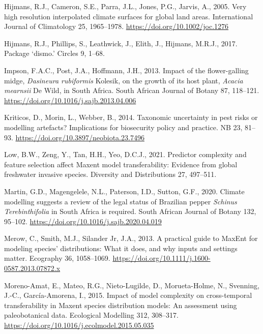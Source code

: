 \documentclass[12pt,]{article}
\begin{document}
\begin{CSLReferences}{1}{0}
\leavevmode\hypertarget{ref-Hijmans2005}{}%
Hijmans, R.J., Cameron, S.E., Parra, J.L., Jones, P.G., Jarvis, A.,
2005. Very high resolution interpolated climate surfaces for global land
areas. International Journal of Climatology 25, 1965--1978.
\url{https://doi.org/10.1002/joc.1276}

\leavevmode\hypertarget{ref-hijmans2017package}{}%
Hijmans, R.J., Phillips, S., Leathwick, J., Elith, J., Hijmans, M.R.J.,
2017. Package {`dismo.'} Circles 9, 1--68.

\leavevmode\hypertarget{ref-Impson2013}{}%
Impson, F.A.C., Post, J.A., Hoffmann, J.H., 2013. Impact of the
flower-galling midge, {\emph{Dasineura rubiformis}} {Kolesik}, on the
growth of its host plant, {\emph{Acacia mearnsii}} {De Wild}, in {South
Africa}. South African Journal of Botany 87, 118--121.
\url{https://doi.org/10.1016/j.sajb.2013.04.006}

\leavevmode\hypertarget{ref-Kriticos2014}{}%
Kriticos, D., Morin, L., Webber, B., 2014. Taxonomic uncertainty in pest
risks or modelling artefacts? {Implications} for biosecurity policy and
practice. NB 23, 81--93. \url{https://doi.org/10.3897/neobiota.23.7496}

\leavevmode\hypertarget{ref-Low2021}{}%
Low, B.W., Zeng, Y., Tan, H.H., Yeo, D.C.J., 2021. Predictor complexity
and feature selection affect {Maxent} model transferability: {Evidence}
from global freshwater invasive species. Diversity and Distributions 27,
497--511.

\leavevmode\hypertarget{ref-Martin2020}{}%
Martin, G.D., Magengelele, N.L., Paterson, I.D., Sutton, G.F., 2020.
Climate modelling suggests a review of the legal status of {Brazilian}
pepper {\emph{Schinus}}{ \emph{Terebinthifolia}} in {South Africa} is
required. South African Journal of Botany 132, 95--102.
\url{https://doi.org/10.1016/j.sajb.2020.04.019}

\leavevmode\hypertarget{ref-Merow2013}{}%
Merow, C., Smith, M.J., Silander Jr, J.A., 2013. A practical guide to
{MaxEnt} for modeling species' distributions: What it does, and why
inputs and settings matter. Ecography 36, 1058--1069.
\url{https://doi.org/10.1111/j.1600-0587.2013.07872.x}

\leavevmode\hypertarget{ref-Moreno-Amat2015}{}%
Moreno-Amat, E., Mateo, R.G., Nieto-Lugilde, D., Morueta-Holme, N.,
Svenning, J.-C., García-Amorena, I., 2015. Impact of model complexity on
cross-temporal transferability in {Maxent} species distribution models:
{An} assessment using paleobotanical data. Ecological Modelling 312,
308--317. \url{https://doi.org/10.1016/j.ecolmodel.2015.05.035}


\end{CSLReferences}
\end{document}
